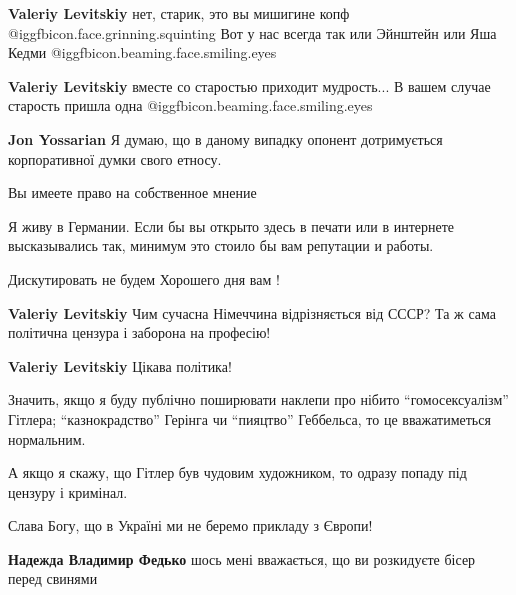 \begin{itemize}
\begin{itemize}
\begin{itemize} %
\textbf{Valeriy Levitskiy} нет, старик, это вы мишигине копф  @igg{fbicon.face.grinning.squinting} 
Вот у нас всегда так или Эйнштейн или Яша Кедми  @igg{fbicon.beaming.face.smiling.eyes} 

\textbf{Valeriy Levitskiy} вместе со старостью приходит мудрость... В вашем случае старость пришла одна  @igg{fbicon.beaming.face.smiling.eyes} 

\textbf{Jon Yossarian} Я думаю, що в даному випадку опонент дотримується корпоративної думки свого етносу.
\end{itemize} %


Вы имеете право на собственное мнение

Я живу в Германии. Если бы вы открыто здесь в печати или в интернете
высказывались так, минимум это стоило бы вам репутации и работы.

Дискутировать не будем Хорошего дня вам !

\begin{itemize} %
\textbf{Valeriy Levitskiy} Чим сучасна Німеччина відрізняється від СССР? Та ж сама політична цензура і заборона на професію!

\textbf{Valeriy Levitskiy} Цікава політика!

Значить, якщо я буду публічно поширювати наклепи про нібито \enquote{гомосексуалізм}
Гітлера; \enquote{казнокрадство} Герінга чи \enquote{пияцтво} Геббельса, то це вважатиметься
нормальним.

А якщо я скажу, що Гітлер був чудовим художником, то одразу попаду під цензуру
і кримінал.

Слава Богу, що в Україні ми не беремо прикладу з Європи!
\end{itemize} %

\textbf{Надежда Владимир Федько} шось мені вважається, що ви розкидуєте бісер перед свинями

\end{itemize} %

\end{itemize} %
